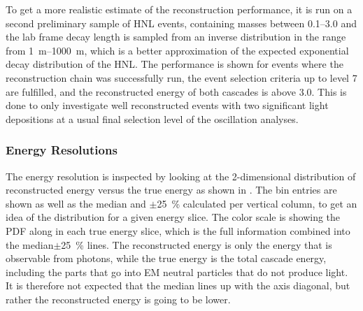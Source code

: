 To get a more realistic estimate of the reconstruction performance, it is run on a second preliminary sample of HNL events, containing masses between \SIrange[range-phrase=~and~]{0.1}{3.0}{\gev} and the lab frame decay length is sampled from an inverse distribution in the range from \SIrange{1}{1000}{\meter}, which is a better approximation of the expected exponential decay distribution of the HNL. The performance is shown for events where the reconstruction chain was successfully run, the event selection criteria up to level 7 are fulfilled, and the reconstructed energy of both cascades is above \SI{3.0}{\gev}. This is done to only investigate well reconstructed events with two significant light depositions at a usual final selection level of the oscillation analyses.


\subsubsection{Energy Resolutions}

The energy resolution is inspected by looking at the 2-dimensional distribution of reconstructed energy versus the true energy as shown in . The bin entries are shown as well as the median and $\pm$\SI{25}{\percent} calculated per vertical column, to get an idea of the distribution for a given energy slice. The color scale is showing the PDF along in each true energy slice, which is the full information combined into the median$\pm$\SI{25}{\percent} lines. The reconstructed energy is only the energy that is observable from photons, while the true energy is the total cascade energy, including the parts that go into EM neutral particles that do not produce light. It is therefore not expected that the median lines up with the axis diagonal, but rather the reconstructed energy is going to be lower.

